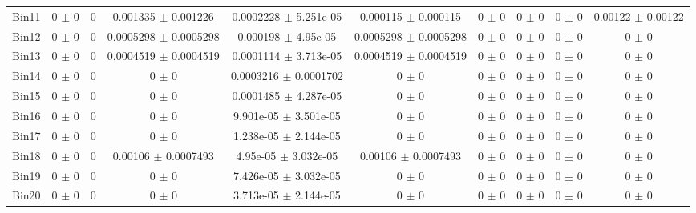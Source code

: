 \begin{tabular}{@{\extracolsep{4pt}}lccccccccc@{}}
     Bin11 & 0 $\pm$ 0 & 0 & 0.001335 $\pm$ 0.001226 & 0.0002228 $\pm$ 5.251e-05 & 0.000115 $\pm$ 0.000115 & 0 $\pm$ 0 & 0 $\pm$ 0 & 0 $\pm$ 0 & 0.00122 $\pm$ 0.00122 \\ 
     Bin12 & 0 $\pm$ 0 & 0 & 0.0005298 $\pm$ 0.0005298 & 0.000198 $\pm$ 4.95e-05 & 0.0005298 $\pm$ 0.0005298 & 0 $\pm$ 0 & 0 $\pm$ 0 & 0 $\pm$ 0 & 0 $\pm$ 0 \\ 
     Bin13 & 0 $\pm$ 0 & 0 & 0.0004519 $\pm$ 0.0004519 & 0.0001114 $\pm$ 3.713e-05 & 0.0004519 $\pm$ 0.0004519 & 0 $\pm$ 0 & 0 $\pm$ 0 & 0 $\pm$ 0 & 0 $\pm$ 0 \\ 
     Bin14 & 0 $\pm$ 0 & 0 & 0 $\pm$ 0 & 0.0003216 $\pm$ 0.0001702 & 0 $\pm$ 0 & 0 $\pm$ 0 & 0 $\pm$ 0 & 0 $\pm$ 0 & 0 $\pm$ 0 \\ 
     Bin15 & 0 $\pm$ 0 & 0 & 0 $\pm$ 0 & 0.0001485 $\pm$ 4.287e-05 & 0 $\pm$ 0 & 0 $\pm$ 0 & 0 $\pm$ 0 & 0 $\pm$ 0 & 0 $\pm$ 0 \\ 
     Bin16 & 0 $\pm$ 0 & 0 & 0 $\pm$ 0 & 9.901e-05 $\pm$ 3.501e-05 & 0 $\pm$ 0 & 0 $\pm$ 0 & 0 $\pm$ 0 & 0 $\pm$ 0 & 0 $\pm$ 0 \\ 
     Bin17 & 0 $\pm$ 0 & 0 & 0 $\pm$ 0 & 1.238e-05 $\pm$ 2.144e-05 & 0 $\pm$ 0 & 0 $\pm$ 0 & 0 $\pm$ 0 & 0 $\pm$ 0 & 0 $\pm$ 0 \\ 
     Bin18 & 0 $\pm$ 0 & 0 & 0.00106 $\pm$ 0.0007493 & 4.95e-05 $\pm$ 3.032e-05 & 0.00106 $\pm$ 0.0007493 & 0 $\pm$ 0 & 0 $\pm$ 0 & 0 $\pm$ 0 & 0 $\pm$ 0 \\ 
     Bin19 & 0 $\pm$ 0 & 0 & 0 $\pm$ 0 & 7.426e-05 $\pm$ 3.032e-05 & 0 $\pm$ 0 & 0 $\pm$ 0 & 0 $\pm$ 0 & 0 $\pm$ 0 & 0 $\pm$ 0 \\ 
     Bin20 & 0 $\pm$ 0 & 0 & 0 $\pm$ 0 & 3.713e-05 $\pm$ 2.144e-05 & 0 $\pm$ 0 & 0 $\pm$ 0 & 0 $\pm$ 0 & 0 $\pm$ 0 & 0 $\pm$ 0 \\ 
\hline\hline
  \end{tabular}
